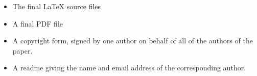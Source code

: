 \documentclass[runningheads,a4paper]{llncs}
\begin{document}


% 
% 
% 
% 
% 
% 
% 
% 


\begin{itemize}
\settowidth{\leftmargin}{{\Large$\square$}}\advance\leftmargin{}
\itemsep8pt\relax
\renewcommand\labelitemi{{\lower1.5pt\hbox{\Large$\square$}}}

\item The final \LaTeX{} source files
\item A final PDF file
\item A copyright form, signed by one author on behalf of all of the
authors of the paper.
\item A readme giving the name and email address of the
corresponding author.
\end{itemize}
\end{document}
